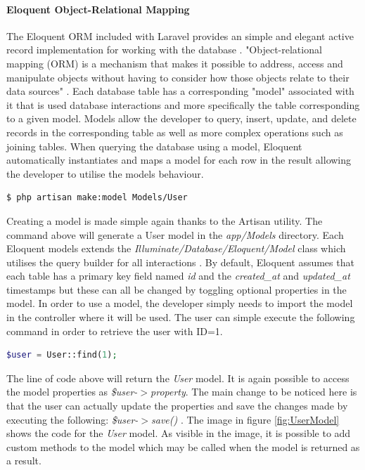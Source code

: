 \paragraph{Eloquent Object-Relational Mapping}
The Eloquent ORM included with Laravel provides an simple and elegant active record implementation for working with the database \cite{Laravel:Eloquent}. "Object-relational mapping (ORM) is a mechanism that makes it possible to address, access and manipulate objects without having to consider how those objects relate to their data sources" \cite{TechTarget:ORM}. Each database table has a corresponding "model" associated with it that is used database interactions and more specifically the table corresponding to a given model. Models allow the developer to query, insert, update, and delete records in the corresponding table as well as more complex operations such as joining tables. When querying the database using a model, Eloquent automatically instantiates and maps a model for each row in the result allowing the developer to utilise the models behaviour.

\begin{lstlisting}[language=bash]
	$ php artisan make:model Models/User
\end{lstlisting}

\noindent Creating a model is made simple again thanks to the Artisan utility. The command above will generate a User model in the \emph{app/Models} directory. Each Eloquent models extends the \emph{Illuminate/Database/Eloquent/Model} class which utilises the query builder for all interactions \cite{Laravel:Eloquent}. By default, Eloquent assumes that each table has a primary key field named \emph{id} and the \emph{created\_at} and \emph{updated\_at} timestamps but these can all be changed by toggling optional properties in the model. In order to use a model, the developer simply needs to import the model in the controller where it will be used. The user can simple execute the following command in order to retrieve the user with ID=1.

\begin{lstlisting}[language=php]
	$user = User::find(1);
\end{lstlisting}

\noindent The line of code above will return the \emph{User} model. It is again possible to access the model properties as \emph{\$user-$>$property}. The main change to be noticed here is that the user can actually update the properties and save the changes made by executing the following: \emph{\$user-$>$save()} \cite{Laravel:Eloquent}.  The image in figure \ref{fig:UserModel} shows the code for the \emph{User} model. As visible in the image, it is possible to add custom methods to the model which may be called when the model is returned as a result.

